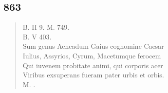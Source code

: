 \documentclass[11pt, a4paper]{report}
\begin{document}
            \subsection*{863}
      \begin{verse}
      B. II 9. M. 749. \\ B. V 403. \\ Sum genus Aeneadum Gaius cognomine Caesar \\ Iulius, Assyrios, Cyrum, Macetumque ferocem \\ Qui iuvenem probitate animi, qui corporis acer \\ Viribus exsuperans fueram pater urbis et orbis. \\ M. . \\ 
      \end{verse}
  
\end{document}
